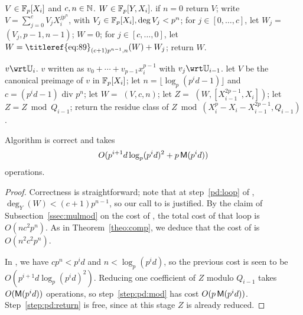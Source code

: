 \begin{algorithm}
  \caption{}
  \label{alg:push-down-rec}
  \begin{algorithmic}[1]
    \REQUIRE $V\in \mathbb{F}_p[X_i]$ and $c,n\in\mathbb{N}$.
    \ENSURE $W \in\mathbb{F}_p[Y,X_i]$.
    \STATE if $n=0$ return $V$;
    \STATE write $V=\sum_{j=0}^{c} V_j X_i^{jp^n}$, with $V_j \in \mathbb{F}_p[X_i], \deg V_j<p^n$;
    \STATE for $j\in [0,\dots,c]$, let $W_j=$ $(V_j,p-1,n-1)$;
    \STATE $W=0$;
    \STATE\label{pd:loop} for $j\in [c,\dots,0]$, let $W=\text{\titleref{eq:89}}_{(c+1)p^{n-1},n}(W) + W_j$;
    \STATE return $W$.
  \end{algorithmic}
\end{algorithm}

\begin{algorithm}
  \caption{}
  \label{alg:push-down}
  \begin{algorithmic}[1]
    \REQUIRE $v\wrt \U_i$.
    \ENSURE $v$ written as $v_0+\cdots+v_{p-1}x_i^{p-1}$ with $v_j \wrt \U_{i-1}$.
    \STATE let $V$ be the canonical preimage of $v$ in $\mathbb{F}_p[X_i]$;
    \STATE let $n=\lfloor \log_p(p^id-1) \rfloor$ and $c=(p^id-1)\text{ div } p^n$;
    \STATE let $W =$ $(V,c,n)$;
    \STATE let $Z =$ $(W,[X_{i-1}^{2p-1},X_i])$;
    \STATE \label{step:pd:mod} let $Z = Z \bmod Q_{i-1}$;
    \STATE \label{step:pd:return} return the residue class of $Z \bmod (X_i^p - X_i - X_{i-1}^{2p-1},Q_{i-1})$.
  \end{algorithmic}
\end{algorithm}

\begin{proposition}\label{prop:pd}
  Algorithm  is correct and takes 
  \begin{equation}
    \label{eq:92}
    O(p^{i+1}d
    \log_p(p^id)^2 + p\,\mathsf{M}(p^id))
  \end{equation}
  operations.
\end{proposition}
\begin{proof}
  Correctness is straightforward; note that at step~\ref{pd:loop} of
  , $\deg_Y(W) < (c+1)p^{n-1}$, so our
  call to  is justified. By the claim of
  Subsection~\ref{ssec:mulmod} on the cost of , the
  total cost of that loop is $O(nc^2p^n)$. As in
  Theorem~\ref{theo:comp}, we deduce that the cost of
   is $O(n^2c^2p^n)$.

  In , we have $cp^n< p^id$ and $n<\log_p
  (p^id)$, so the previous cost is seen to be $O(p^{i+1}d
  \log_p(p^id)^2)$. Reducing one coefficient of $Z$ modulo $Q_{i-1}$
  takes $O(\mathsf{M}(p^id))$ operations, so step~\ref{step:pd:mod} has
  cost $O(p\,\mathsf{M}(p^id))$. Step~\ref{step:pd:return} is free, since
  at this stage $Z$ is already reduced.
\end{proof}

